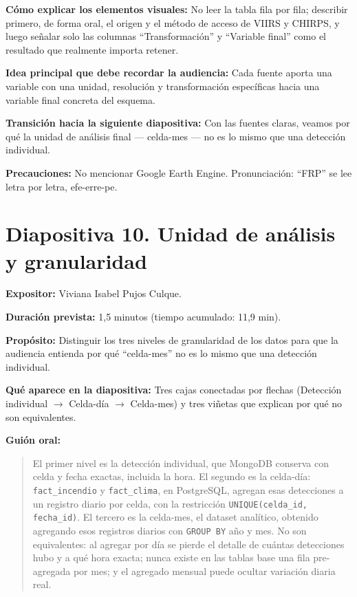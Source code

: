 \documentclass[11pt,a4paper]{article}
\newcommand{\campo}[2]{\par\medskip\noindent\textbf{#1:} #2\par}
\newenvironment{guionoral}{%
  \medskip\noindent\textbf{Gui\'on oral:}\par\smallskip
  \begin{quote}\small
}{%
  \end{quote}
}
\newcommand{\separadordiapositiva}{\bigskip\noindent{\color{Tierra!60}\hrulefill}\bigskip}
\begin{document}
\campo{C\'omo explicar los elementos visuales}{No leer la tabla fila
por fila; describir primero, de forma oral, el origen y el m\'etodo de
acceso de VIIRS y CHIRPS, y luego se\~nalar solo las columnas
``Transformaci\'on'' y ``Variable final'' como el resultado que
realmente importa retener.}
\campo{Idea principal que debe recordar la audiencia}{Cada fuente
aporta una variable con una unidad, resoluci\'on y transformaci\'on
espec\'ificas hacia una variable final concreta del esquema.}
\campo{Transici\'on hacia la siguiente diapositiva}{Con las fuentes
claras, veamos por qu\'e la unidad de an\'alisis final --- celda-mes
--- no es lo mismo que una detecci\'on individual.}
\campo{Precauciones}{No mencionar Google Earth Engine. Pronunciaci\'on:
``FRP'' se lee letra por letra, efe-erre-pe.}

\separadordiapositiva

\section*{Diapositiva 10. Unidad de an\'alisis y granularidad}

\campo{Expositor}{Viviana Isabel Pujos Culque.}
\campo{Duraci\'on prevista}{1,5 minutos (tiempo acumulado: 11,9 min).}
\campo{Prop\'osito}{Distinguir los tres niveles de granularidad de los
datos para que la audiencia entienda por qu\'e ``celda-mes'' no es lo
mismo que una detecci\'on individual.}
\campo{Qu\'e aparece en la diapositiva}{Tres cajas conectadas por
flechas (Detecci\'on individual $\rightarrow$ Celda-d\'ia $\rightarrow$
Celda-mes) y tres vi\~netas que explican por qu\'e no son
equivalentes.}

\begin{guionoral}
El primer nivel es la detecci\'on individual, que MongoDB conserva con
celda y fecha exactas, incluida la hora. El segundo es la celda-d\'ia:
\texttt{fact\_incendio} y \texttt{fact\_clima}, en PostgreSQL, agregan
esas detecciones a un registro diario por celda, con la restricci\'on
\texttt{UNIQUE(celda\_id, fecha\_id)}. El tercero es la celda-mes, el
dataset anal\'itico, obtenido agregando esos registros diarios con
\texttt{GROUP BY} a\~no y mes. No son equivalentes: al agregar por d\'ia
se pierde el detalle de cu\'antas detecciones hubo y a qu\'e hora
exacta; nunca existe en las tablas base una fila pre-agregada por mes;
y el agregado mensual puede ocultar variaci\'on diaria real.
\end{guionoral}
\end{document}
